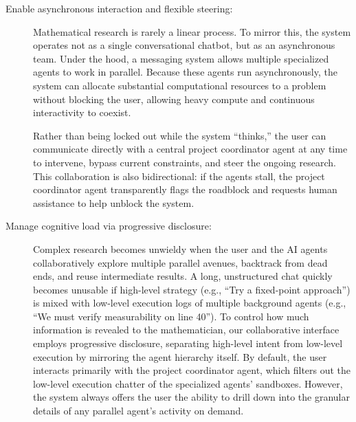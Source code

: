 \documentclass[11pt, a4paper, copyright, gdm]{google}
\begin{document}
\begin{description}
\item[Enable asynchronous interaction and flexible steering:] Mathematical research is rarely a linear process. To mirror this, the system operates not as a single conversational chatbot, but as an asynchronous team.
Under the hood, a messaging system allows multiple specialized agents to work in parallel.
Because these agents run asynchronously, the system can allocate substantial computational resources to a problem without blocking the user, allowing heavy compute and continuous interactivity to coexist.

Rather than being locked out while the system ``thinks,'' the user can communicate directly with a central project coordinator agent at any time to intervene, bypass current constraints, and steer the ongoing research.
This collaboration is also bidirectional: if the agents stall, the project coordinator agent transparently flags the roadblock and requests human assistance to help unblock the system.

\item[Manage cognitive load via progressive disclosure:] Complex research becomes unwieldy when the user and the AI agents collaboratively explore multiple parallel avenues, backtrack from dead ends, and reuse intermediate results.
A long, unstructured chat quickly becomes unusable if high-level strategy (e.g., ``Try a fixed-point approach'') is mixed with low-level execution logs of multiple background agents (e.g., ``We must verify measurability on line 40'').
To control how much information is revealed to the mathematician, our collaborative interface employs progressive disclosure, separating high-level intent from low-level execution by mirroring the agent hierarchy itself.
By default, the user interacts primarily with the project coordinator agent, which filters out the low-level execution chatter of the specialized agents' sandboxes.
However, the system always offers the user the ability to drill down into the granular details of any parallel agent's activity on demand.


\end{description}
\end{document}
